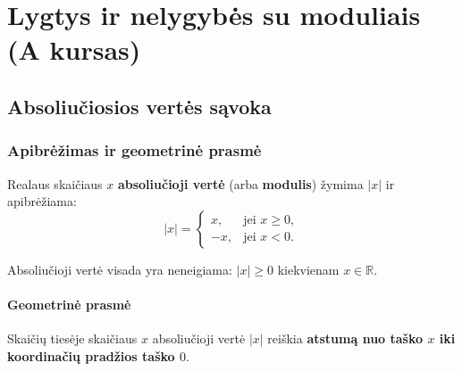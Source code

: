 \chapter{Lygtys ir nelygybės su moduliais (A kursas)}

\section{Absoliučiosios vertės sąvoka}

\subsection{Apibrėžimas ir geometrinė prasmė}

\begin{definition}
Realaus skaičiaus $x$ \textbf{absoliučioji vertė} (arba \textbf{modulis}) žymima $|x|$ ir apibrėžiama:
\[
|x| =
\begin{cases}
x, & \text{jei } x \geq 0, \\
-x, & \text{jei } x < 0.
\end{cases}
\]
\end{definition}

\begin{remark}
Absoliučioji vertė visada yra neneigiama: $|x| \geq 0$ kiekvienam $x \in \mathbb{R}$.
\end{remark}

\subsubsection*{Geometrinė prasmė}

Skaičių tiesėje skaičiaus $x$ absoliučioji vertė $|x|$ reiškia \textbf{atstumą nuo taško $x$ iki koordinačių pradžios taško $0$}.

\begin{center}
\end{center}

